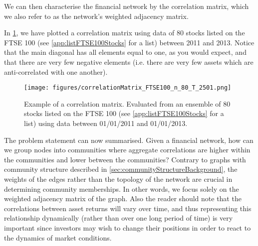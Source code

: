 We can then characterise the financial network by the correlation matrix, which we also refer to as the network's weighted adjacency matrix.

In \cref{fig:exampleCrossCorrelationMatrix}, we have plotted a correlation matrix using data of 80 stocks listed on the FTSE 100 (see \cref{app:listFTSE100Stocks} for a list) between 2011 and 2013. Notice that the main diagonal has all elements equal to one, as you would expect, and that there are very few negative elements (i.e. there are very few assets which are anti-correlated with one another).

\begin{figure}
	\centering
	\texttt{[image: figures/correlationMatrix\_FTSE100\_n\_80\_T\_2501.png]}
	\caption[Example plot for a correlation matrix]{\label{fig:exampleCrossCorrelationMatrix} Example of a correlation matrix. Evaluated from an ensemble of 80 stocks listed on the FTSE 100 (see \cref{app:listFTSE100Stocks} for a list) using data between 01/01/2011 and 01/01/2013.}
\end{figure}

The problem statement can now summarised.
Given a financial network, how can we group nodes into communities where aggregate correlations are higher within the communities and lower between the communities?
Contrary to graphs with community structure described in \cref{sec:communityStructureBackground}, the weights of the edges rather than the topology of the network are crucial in determining community memberships.
In other words, we focus solely on the weighted adjacency matrix of the graph.
Also the reader should note that the correlations between asset returns will vary over time, and thus representing this relationship dynamically (rather than over one long period of time) is very important since investors may wish to change their positions in order to react to the dynamics of market conditions.

